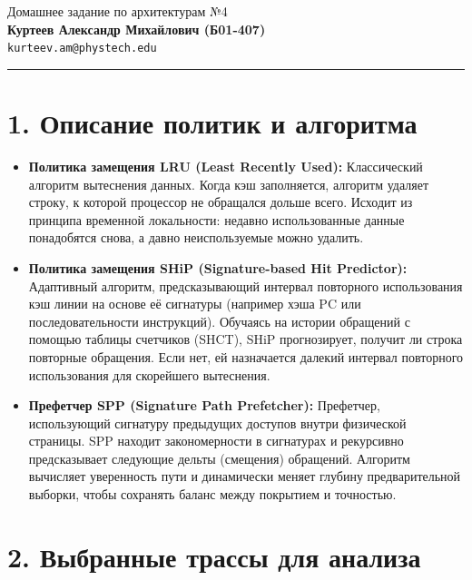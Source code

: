 \documentclass[11pt,a4paper]{article}
\begin{document}
\begin{center}
    \textsf{\LARGE Домашнее задание по архитектурам №4} \\
    \vspace{0.5em}
    \vspace{1.5em}
    \textbf{Куртеев Александр Михайлович (Б01-407)} \\
    \texttt{kurteev.am@phystech.edu} \\
    \vspace{1em}
    \hrule
\end{center}

\newpage

\section*{1. Описание политик и алгоритма}

\begin{itemize}
    \item \textbf{Политика замещения LRU (Least Recently Used):} Классический алгоритм вытеснения данных. Когда кэш заполняется, алгоритм удаляет строку, к которой процессор не обращался дольше всего. Исходит из принципа временной локальности: недавно использованные данные понадобятся снова, а давно неиспользуемые можно удалить.
    
    \item \textbf{Политика замещения SHiP (Signature-based Hit Predictor):} Адаптивный алгоритм, предсказывающий интервал повторного использования кэш линии на основе её сигнатуры (например хэша PC или последовательности инструкций). Обучаясь на истории обращений с помощью таблицы счетчиков (SHCT), SHiP прогнозирует, получит ли строка повторные обращения. Если нет, ей назначается далекий интервал повторного использования для скорейшего вытеснения.
    
    \item \textbf{Префетчер SPP (Signature Path Prefetcher):} Префетчер, использующий сигнатуру предыдущих доступов внутри физической страницы. SPP находит закономерности в сигнатурах и рекурсивно предсказывает следующие дельты (смещения) обращений. Алгоритм вычисляет уверенность пути и динамически меняет глубину предварительной выборки, чтобы сохранять баланс между покрытием и точностью.
\end{itemize}

\section*{2. Выбранные трассы для анализа}
\end{document}
